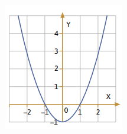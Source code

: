 \documentclass[11pt]{book}
\begin{document}
\begin{enumerate}
\begin{enumerate}
\begin{minipage}[t]{0.3\textwidth}
\begin{figure}[H]
              \includegraphics[width=\linewidth]{parabole03.png}
              \label{fig:parabole03}
            \end{figure}
          \end{minipage}


\end{enumerate}
\end{enumerate}
\end{document}

